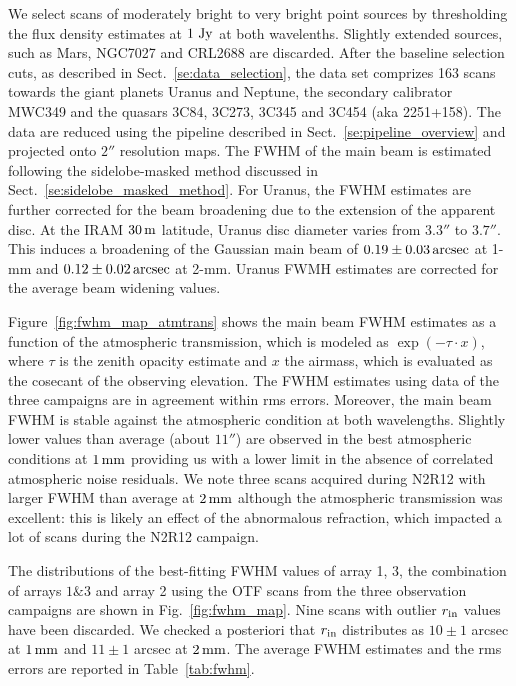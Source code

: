 We select scans of moderately bright to very bright point sources by
thresholding the flux density estimates at $1~\rm{Jy}$ at both
wavelenths. Slightly extended sources, such as Mars, NGC7027 and
CRL2688 are discarded. After the baseline selection cuts, as described in
Sect.~\ref{se:data_selection}, the data set comprizes 163 scans
towards the giant planets Uranus and Neptune, the secondary calibrator
MWC349 and the quasars 3C84, 3C273, 3C345 and 3C454 (aka
2251+158). The data are reduced using the pipeline described in
Sect.~\ref{se:pipeline_overview} and projected onto $2''$ resolution
maps. The FWHM of the main beam is estimated following the
sidelobe-masked method
discussed in Sect.~\ref{se:sidelobe_masked_method}. For Uranus, the
FWHM estimates are further corrected for the beam broadening due to the
extension of the apparent
disc. At the IRAM $30\,\rm{m}$ latitude, Uranus disc diameter varies
from $3.3''$ to $3.7''$. This induces a broadening of the Gaussian main beam of
$0.19 \pm 0.03\,\rm{arcsec}$ at 1-mm and $0.12 \pm 0.02\,\rm{arcsec}$
at 2-mm. Uranus FWMH estimates are corrected for the average beam
widening values.

Figure~\ref{fig:fwhm_map_atmtrans} shows the main beam FWHM estimates
as a function of the atmospheric transmission, which is modeled as
$\exp{\left(-\tau \cdot x\right)}$, where $\tau$ is the zenith opacity estimate and
$x$ the airmass, which is evaluated as the cosecant of the observing
elevation. The FWHM estimates using data of the three campaigns are in
agreement within rms errors. Moreover, the main beam FWHM is stable
against the atmospheric condition at both wavelengths. Slightly lower
values than average (about $11''$) are observed in the best
atmospheric conditions at $1\,\rm{mm}$ providing us with a lower limit
in the absence of correlated atmospheric noise residuals. We note
three scans acquired during N2R12 with larger FWHM than average at
$2\,\rm{mm}$ although the atmospheric transmission was excellent: this
is likely an effect of the abnormalous refraction, which impacted
a lot of scans during the N2R12 campaign. 

The distributions of the best-fitting FWHM values of array 1, 3, the
combination of arrays $1\&3$ and array 2 using the OTF scans from the
three observation campaigns are shown in Fig.~\ref{fig:fwhm_map}. Nine
scans with outlier $r_{\rm{in}}$ values have been discarded.
We checked a posteriori that $r_{\rm{in}}$
distributes as $10 \pm 1$ arcsec at $1\,\rm{mm}$ and $11 \pm 1$ arcsec
at $2\,\rm{mm}$. The average FWHM estimates and the rms errors are
reported in Table~\ref{tab:fwhm}.  


